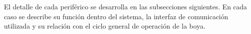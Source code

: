 El detalle de cada periférico se desarrolla en las subsecciones siguientes. En cada caso se describe su función dentro del sistema, la interfaz de comunicación utilizada y su relación con el ciclo general de operación de la boya.

%
%
%
%
%
%
%
%
%
%
%
